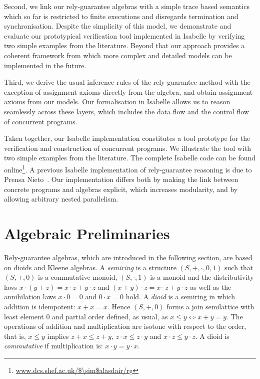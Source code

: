 \documentclass{llncs}
\begin{document}
Second, we link our rely-guarantee algebras with a simple trace based
semantics which so far is restricted to finite executions and
disregards termination and synchronisation. Despite the simplicity of
this model, we demonstrate and evaluate our prototypical verification
tool implemented in Isabelle by verifying two simple examples from
the literature. Beyond that our approach provides a coherent framework
from which more complex and detailed models can be implemented in the
future.

Third, we derive the usual inference rules of the rely-guarantee
method with the exception of assignment axioms directly from the
algebra, and obtain assignment axioms from our models. Our
formalisation in Isabelle allows us to reason seamlessly across these
layers, which includes the data flow and the control flow of concurrent
programs.

Taken together, our Isabelle implementation constitutes a tool
prototype for the verification and construction of concurrent
programs. We illustrate the tool with two simple examples from the
literature. The complete Isabelle code can be found
online\footnote{\url{www.dcs.shef.ac.uk/$\sim$alasdair/rg}}. A
previous Isabelle implementation of rely-guarantee reasoning is due to
Prensa Nieto~\cite{nieto_rely-guarantee_2003}. Our implementation
differs both by making the link between concrete programs and algebras
explicit, which increases modularity, and by allowing arbitrary nested parallelism.

\section{Algebraic Preliminaries}
\label{sec:KA}

Rely-guarantee algebras, which are introduced in the following
section, are based on dioids and Kleene algebras. A \emph{semiring} is
a structure $(S,+,\cdot,0,1)$ such that $(S,+,0)$ is a commutative
monoid, $(S,\cdot, 1)$ is a monoid and the distributivity laws $x\cdot
(y+z)=x\cdot z + y \cdot z$ and $(x+y)\cdot z = x\cdot z+y\cdot z$ as
well as the annihilation laws $x\cdot 0=0$ and $0\cdot x=0$ hold. A
\emph{dioid} is a semiring in which addition is idempotent:
$x+x=x$. Hence $(S,+,0)$ forms a join semilattice with least element
$0$ and partial order defined, as usual, as $x\le y\Leftrightarrow
x+y=y$. The operations of addition and multiplication are isotone with
respect to the order, that is, $x \le y $ implies $z+x\le z+y$,
$z\cdot x \le z\cdot y$ and $x\cdot z \le y\cdot z$. A dioid is
\emph{commutative} if multiplication is: $x\cdot y = y \cdot x$.
\end{document}
